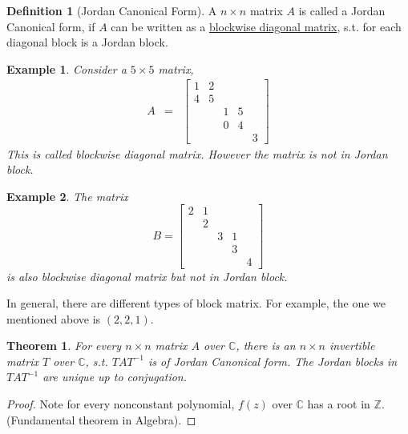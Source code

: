 \documentclass{article}
\theoremstyle{MyNonumberplain}
\theoremstyle{break}
\newtheorem*{proof}{Proof. }
\theoremstyle{break}
\newtheorem{theorem}{Theorem}[section]
\newtheorem{example}{Example}[section]
\theoremstyle{break}
\theoremstyle{definition}
\theoremstyle{break}
\newtheorem{definition}{Definition}[section]
\begin{document}
\begin{defbox}
    \begin{definition}[Jordan Canonical Form]
        A $n \times n$ matrix $A$ is called a Jordan Canonical form, if $A$ can be
        written as a {\underline{blockwise diagonal matrix}}, s.t. for each diagonal
        block is a Jordan block.
    \end{definition}
\end{defbox}

\begin{expbox}
    \begin{example}
        Consider a $5 \times 5$ matrix,
        \begin{eqnarray*}
          A & = & \left[\begin{array}{ccccc}
            1 & 2 &  &  & \\
            4 & 5 &  &  & \\
            &  & 1 & 5 & \\
            &  & 0 & 4 & \\
            &  &  &  & 3
          \end{array}\right]
        \end{eqnarray*}
        This is called blockwise diagonal matrix. However the matrix is not in Jordan
        block.
    \end{example}
\end{expbox}

\begin{expbox}
    \begin{example}
        The matrix
        \[ B = \left[\begin{array}{ccccc}
             2 & 1 &  &  & \\
             & 2 &  &  & \\
             &  & 3 & 1 & \\
             &  &  & 3 & \\
             &  &  &  & 4
           \end{array}\right] \]
        is also blockwise diagonal matrix but not in Jordan block.
    \end{example}
\end{expbox}

In general, there are different types of block matrix. For example, the one we mentioned above is $(2,2,1)$.

\begin{thmbox}
    \begin{theorem}
        For every $n \times n$ matrix $A$ over $\mathbb{C}$, there is an $n \times n$
        invertible matrix $T$ over $\mathbb{C}$, s.t. $T A T^{- 1}$ is of Jordan
        Canonical form. The Jordan blocks in $T A T^{- 1}$ are unique up to
        conjugation.
    \end{theorem}
    \begin{prfbox}
        \begin{proof}
            Note for every nonconstant polynomial, $f (z)$ over $\mathbb{C}$ has a root in
            $\mathbb{Z}$. (Fundamental theorem in Algebra).
        \end{proof}
    \end{prfbox}
\end{thmbox}
\end{document}
